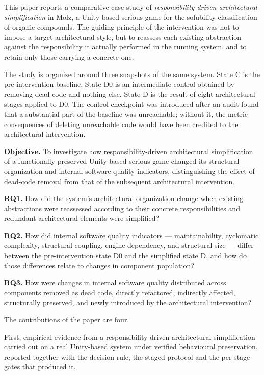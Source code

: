\documentclass[pdflatex,sn-basic]{sn-jnl}
\begin{document}
This paper reports a comparative case study of \emph{responsibility-driven architectural simplification} in Molz, a Unity-based serious game for the solubility classification of organic compounds. The guiding principle of the intervention was not to impose a target architectural style, but to reassess each existing abstraction against the responsibility it actually performed in the running system, and to retain only those carrying a concrete one.

The study is organized around three snapshots of the same system. State C is the pre-intervention baseline. State D0 is an intermediate control obtained by removing dead code and nothing else. State D is the result of eight architectural stages applied to D0. The control checkpoint was introduced after an audit found that a substantial part of the baseline was unreachable; without it, the metric consequences of deleting unreachable code would have been credited to the architectural intervention.

\medskip\noindent\textbf{Objective.} To investigate how responsibility-driven architectural simplification of a functionally preserved Unity-based serious game changed its structural organization and internal software quality indicators, distinguishing the effect of dead-code removal from that of the subsequent architectural intervention.

\medskip\noindent\textbf{RQ1.} How did the system's architectural organization change when existing abstractions were reassessed according to their concrete responsibilities and redundant architectural elements were simplified?

\medskip\noindent\textbf{RQ2.} How did internal software quality indicators --- maintainability, cyclomatic complexity, structural coupling, engine dependency, and structural size --- differ between the pre-intervention state D0 and the simplified state D, and how do those differences relate to changes in component population?

\medskip\noindent\textbf{RQ3.} How were changes in internal software quality distributed across components removed as dead code, directly refactored, indirectly affected, structurally preserved, and newly introduced by the architectural intervention?

\medskip

The contributions of the paper are four.

First, empirical evidence from a responsibility-driven architectural simplification carried out on a real Unity-based system under verified behavioural preservation, reported together with the decision rule, the staged protocol and the per-stage gates that produced it.
\end{document}
